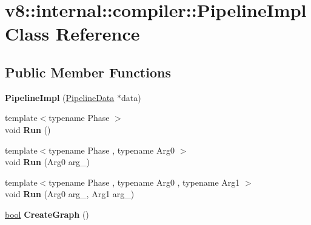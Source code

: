 \hypertarget{classv8_1_1internal_1_1compiler_1_1PipelineImpl}{}\section{v8\+:\+:internal\+:\+:compiler\+:\+:Pipeline\+Impl Class Reference}
\label{classv8_1_1internal_1_1compiler_1_1PipelineImpl}
\subsection*{Public Member Functions}
\begin{DoxyCompactItemize}
\item 
\mbox{\label{classv8_1_1internal_1_1compiler_1_1PipelineImpl_a7c75662469b34411b3ef0749bfa60695}} 
{\bfseries Pipeline\+Impl} (\mbox{\hyperlink{classv8_1_1internal_1_1compiler_1_1PipelineData}{Pipeline\+Data}} $\ast$data)
\item 
\mbox{\label{classv8_1_1internal_1_1compiler_1_1PipelineImpl_aa22056694d9a71a732c2afb04e822d5a}} 
{\footnotesize template$<$typename Phase $>$ }\\void {\bfseries Run} ()
\item 
\mbox{\label{classv8_1_1internal_1_1compiler_1_1PipelineImpl_afb5bfe4ffc38769e7966deee37aa31a2}} 
{\footnotesize template$<$typename Phase , typename Arg0 $>$ }\\void {\bfseries Run} (Arg0 arg\+\_)
\item 
\mbox{\label{classv8_1_1internal_1_1compiler_1_1PipelineImpl_ac1440054f93a94b0eac502a0617df912}} 
{\footnotesize template$<$typename Phase , typename Arg0 , typename Arg1 $>$ }\\void {\bfseries Run} (Arg0 arg\+\_, Arg1 arg\+\_)
\item 
\mbox{\label{classv8_1_1internal_1_1compiler_1_1PipelineImpl_a3140c73fd272d19920b4aea085d3e2fc}} 
\mbox{\hyperlink{classbool}{bool}} {\bfseries Create\+Graph} ()
\item 
\mbox{\label{classv8_1_1internal_1_1compiler_1_1PipelineImpl_acd1af9ca0ef839d08d7854e80d944b9f}} 

\end{DoxyCompactItemize}
